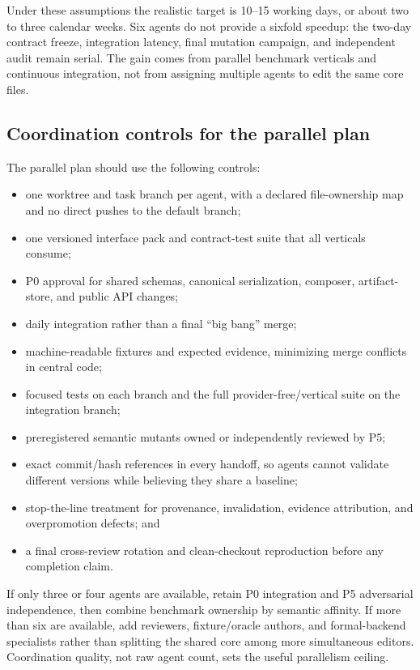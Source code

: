 \documentclass[11pt]{article}
\begin{document}
Under these assumptions the realistic target is 10--15 working days, or about
two to three calendar weeks.  Six agents do not provide a sixfold speedup:
the two-day contract freeze, integration latency, final mutation campaign, and
independent audit remain serial.  The gain comes from parallel benchmark
verticals and continuous integration, not from assigning multiple agents to
edit the same core files.

\subsection{Coordination controls for the parallel plan}

The parallel plan should use the following controls:

\begin{itemize}
\item one worktree and task branch per agent, with a declared file-ownership
      map and no direct pushes to the default branch;
\item one versioned interface pack and contract-test suite that all verticals
      consume;
\item P0 approval for shared schemas, canonical serialization, composer,
      artifact-store, and public API changes;
\item daily integration rather than a final ``big bang'' merge;
\item machine-readable fixtures and expected evidence, minimizing merge
      conflicts in central code;
\item focused tests on each branch and the full provider-free/vertical suite
      on the integration branch;
\item preregistered semantic mutants owned or independently reviewed by P5;
\item exact commit/hash references in every handoff, so agents cannot validate
      different versions while believing they share a baseline;
\item stop-the-line treatment for provenance, invalidation, evidence
      attribution, and overpromotion defects; and
\item a final cross-review rotation and clean-checkout reproduction before any
      completion claim.
\end{itemize}

If only three or four agents are available, retain P0 integration and P5
adversarial independence, then combine benchmark ownership by semantic
affinity.  If more than six are available, add reviewers, fixture/oracle
authors, and formal-backend specialists rather than splitting the shared core
among more simultaneous editors.  Coordination quality, not raw agent count,
sets the useful parallelism ceiling.
\end{document}
